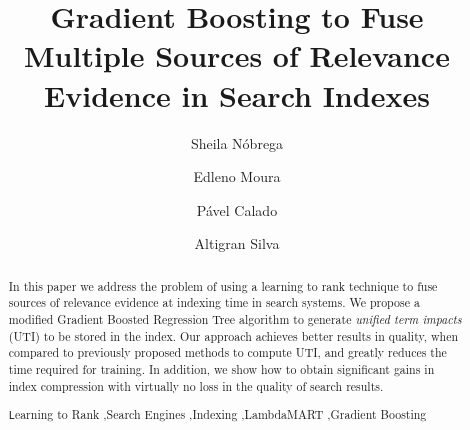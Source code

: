 \documentclass[preprint,review,10pt,3p]{elsarticle}
\begin{document}
\begin{frontmatter}



\title{Gradient Boosting to Fuse Multiple Sources of Relevance Evidence in Search Indexes}

\author[mymainaddress]{Sheila N{\'obrega}}
\author[mymainaddress]{Edleno Moura}
\author[mysecondaryaddress]{P{\'a}vel Calado}
\author[mymainaddress]{Altigran Silva}

\address[mymainaddress]{Universidade Federal do Amazonas, Brasil}
\address[mysecondaryaddress]{INESC-ID, Instituto Superior T{\'e}cnico, Universidade de Lisboa}

\begin{abstract}

In this paper we address the problem of using a learning to rank technique to fuse sources of relevance evidence at indexing time in search systems. We propose a modified Gradient Boosted Regression Tree algorithm to generate \textit{unified term impacts} (UTI) to be stored in the index.
Our approach achieves better results in quality, when compared to previously proposed methods to compute UTI, and greatly reduces the time required for training. In addition, we show how to obtain significant gains in index compression with virtually no loss in the quality of search results.


\begin{keyword}
\texttt Learning to Rank \sep Search Engines \sep Indexing \sep LambdaMART \sep Gradient Boosting
\end{keyword}

\end{abstract}
\end{frontmatter}
\end{document}
